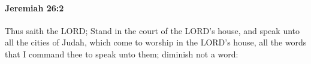 
		\paragraph{Jeremiah 26:2} %
			\label{JEREMIAH-26-2}

			Thus saith the LORD; Stand in the court of the LORD’s house, and speak unto all the cities of Judah, which come to worship in the LORD’s house, all the words that I command thee to speak unto them; diminish not a word:


